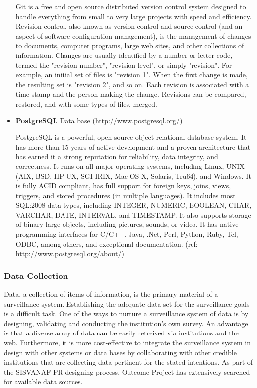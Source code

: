 \documentclass[12pt,letterpaper]{report}
\begin{document}
\begin{itemize}
Git is a free and open source distributed version control system designed to handle everything from small to very large projects with speed and efficiency. Revision control, also known as version control and source control (and an aspect of software configuration management), is the management of changes to documents, computer programs, large web sites, and other collections of information. Changes are usually identified by a number or letter code, termed the "revision number", "revision level", or simply "revision". For example, an initial set of files is "revision 1". When the first change is made, the resulting set is "revision 2", and so on. Each revision is associated with a time stamp and the person making the change. Revisions can be compared, restored, and with some types of files, merged.

\item \textbf{PostgreSQL} Data base (http://www.postgresql.org/)

PostgreSQL is a powerful, open source object-relational database system. It has more than 15 years of active development and a proven architecture that has earned it a strong reputation for reliability, data integrity, and correctness. It runs on all major operating systems, including Linux, UNIX (AIX, BSD, HP-UX, SGI IRIX, Mac OS X, Solaris, Tru64), and Windows. It is fully ACID compliant, has full support for foreign keys, joins, views, triggers, and stored procedures (in multiple languages). It includes most SQL:2008 data types, including INTEGER, NUMERIC, BOOLEAN, CHAR, VARCHAR, DATE, INTERVAL, and TIMESTAMP. It also supports storage of binary large objects, including pictures, sounds, or video. It has native programming interfaces for C/C++, Java, .Net, Perl, Python, Ruby, Tcl, ODBC, among others, and exceptional documentation. (ref: http://www.postgresql.org/about/)

\end{itemize}

\subsubsection{Data Collection}

Data, a collection of items of information, is the primary material of a surveillance system. Establishing the adequate data set for the surveillance goals is a difficult task.  One of the ways to nurture a surveillance system of data is by designing, validating and conducting the institution's own survey.  An advantage is that a diverse array of data can be easily retreived via institutions and the web.  Furthermore, it is more cost-effective to integrate the surveillance system in design with other systems or data bases by collaborating with other credible institutions that are collecting data pertinent for the stated intentions.  As part of the SISVANAF-PR designing process, Outcome Project has extensively searched for available data sources.
\end{document}
